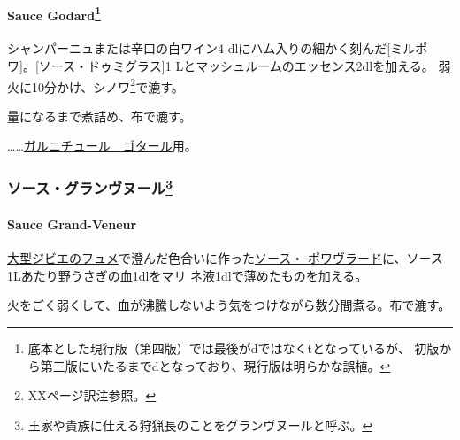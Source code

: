\hypertarget{sauce-godard}{%
\paragraph[Sauce Godard]{\texorpdfstring{Sauce Godard\footnote{底本とした現行版（第四版）では最後がdではなくtとなっているが、
  初版から第三版にいたるまでdとなっており、現行版は明らかな誤植。}}{Sauce Godard}}\label{sauce-godard}}

  

シャンパーニュまたは辛口の白ワイン4 dlにハム入りの細かく刻んだ{[}ミルポ
ワ{]}。{[}ソース・ドゥミグラス{]}1
Lとマッシュルームのエッセンス2dlを加える。
弱火に10分かけ、シノワ\footnote{XXページ訳注参照。}で漉す。

\deuxtiers{}量になるまで煮詰め、布で漉す。

\ldots{}\ldots{}\href{}{ガルニチュール　ゴタール}用。

\maeaki

\hypertarget{ux30bdux30fcux30b9ux30b0ux30e9ux30f3ux30f4ux30ccux30fcux30eb40}{%
\subsubsection[ソース・グランヴヌール]{\texorpdfstring{ソース・グランヴヌール\footnote{王家や貴族に仕える狩猟長のことをグランヴヌールと呼ぶ。}}{ソース・グランヴヌール}}\label{ux30bdux30fcux30b9ux30b0ux30e9ux30f3ux30f4ux30ccux30fcux30eb40}}

\hypertarget{sauce-grand-veneur}{%
\paragraph{Sauce Grand-Veneur}\label{sauce-grand-veneur}}

 

\protect\hyperlink{fonds-de-gibier}{大型ジビエのフュメ}で澄んだ色合いに作った\protect\hyperlink{sauce-poivrade}{ソース・
ポワヴラード}に、ソース1Lあたり野うさぎの血1dlをマリ
ネ液1dlで薄めたものを加える。

火をごく弱くして、血が沸騰しないよう気をつけながら数分間煮る。布で漉す。

\maeaki

